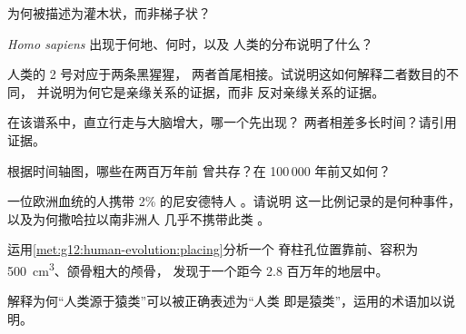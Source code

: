 \begin{exercise}[$\star$]\label{exo:g12:human-evolution:4}
为何被描述为灌木状，而非梯子状？
\end{exercise}

\begin{exercise}[$\star$]\label{exo:g12:human-evolution:5}
\emph{Homo sapiens} 出现于何地、何时，以及
人类的分布说明了什么？
\end{exercise}

\begin{exercise}[$\star\star$]\label{exo:g12:human-evolution:6}
人类的 2 号对应于两条黑猩猩，
两者首尾相接。试说明这如何解释二者数目的不同，
并说明为何它是亲缘关系的证据，而非
反对亲缘关系的证据。
\end{exercise}

\begin{exercise}[$\star\star$]\label{exo:g12:human-evolution:7}
在该谱系中，直立行走与大脑增大，哪一个先出现？
两者相差多长时间？请引用证据。
\end{exercise}

\begin{exercise}[$\star\star$]\label{exo:g12:human-evolution:8}
根据时间轴图，哪些在两百万年前
曾共存？在 100\,000 年前又如何？
\end{exercise}

\begin{exercise}[$\star\star$]\label{exo:g12:human-evolution:9}
一位欧洲血统的人携带 2\% 的尼安德特人 。请说明
这一比例记录的是何种事件，以及为何撒哈拉以南非洲人
几乎不携带此类 。
\end{exercise}

\begin{exercise}[$\star\star$]\label{exo:g12:human-evolution:10}
运用\cref{met:g12:human-evolution:placing}分析一个
脊柱孔位置靠前、容积为 \qty{500}{cm^3}、颌骨粗大的颅骨，
发现于一个距今 2.8 百万年的地层中。
\end{exercise}

\begin{exercise}[$\star\star$]\label{exo:g12:human-evolution:11}
解释为何“人类源于猿类”可以被正确表述为“人类
即是猿类”，运用的术语加以说明。
\end{exercise}

